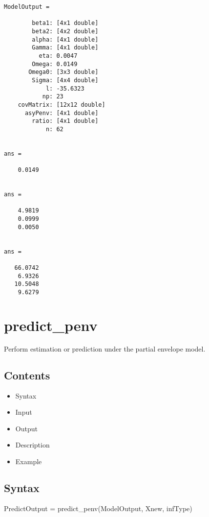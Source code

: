 \documentclass[a4paper,11pt,openany]{memoir}
\begin{document}
        \color{lightgray}\ttfamily \begin{verbatim}
ModelOutput = 

        beta1: [4x1 double]
        beta2: [4x2 double]
        alpha: [4x1 double]
        Gamma: [4x1 double]
          eta: 0.0047
        Omega: 0.0149
       Omega0: [3x3 double]
        Sigma: [4x4 double]
            l: -35.6323
           np: 23
    covMatrix: [12x12 double]
      asyPenv: [4x1 double]
        ratio: [4x1 double]
            n: 62


ans =

    0.0149


ans =

    4.9819
    0.0999
    0.0050


ans =

   66.0742
    6.9326
   10.5048
    9.6279

\end{verbatim} \rmfamily
\color{black}

\newpage

\rmfamily
\color{black}\section{predict\_penv}

\begin{par}
Perform estimation or prediction under the partial envelope model.
\end{par} \vspace{1em}

\subsection*{Contents}

\begin{itemize}
\setlength{\itemsep}{-1ex}
   \item Syntax
   \item Input
   \item Output
   \item Description
   \item Example
\end{itemize}


\subsection*{Syntax}

\begin{par}
PredictOutput = predict\_penv(ModelOutput, Xnew, infType)
\end{par} \vspace{1em}
\end{document}
